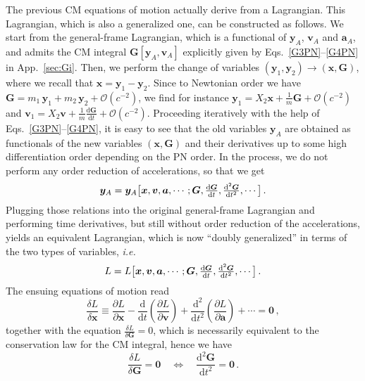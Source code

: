 \documentclass[prd,preprint,superscriptaddress,tightenlines,nofootinbib,
  eqsecnum,showpacs]{revtex4}
\newcommand{\ud}{\mathrm{d}}
\begin{document}
The previous CM equations of motion actually derive from a Lagrangian. This
Lagrangian, which is also a generalized one, can be constructed as follows. We
start from the general-frame Lagrangian, which is a functional of $\bm{y}_A$,
$\bm{v}_A$ and $\bm{a}_A$, and admits the CM integral
$\bm{G}[\bm{y}_A, \bm{v}_A]$ explicitly given by
Eqs.~\eqref{G3PN}--\eqref{G4PN} in App.~\ref{sec:Gi}. Then, we perform the
change of variables $(\bm{y}_1, \bm{y}_2)\longrightarrow (\bm{x}, \bm{G})$,
where we recall that $\bm{x} = \bm{y}_1 - \bm{y}_2$. Since to Newtonian order
we have $\bm{G} = m_1\,\bm{y}_1 + m_2\,\bm{y}_2 + \mathcal{O}(c^{-2})$, we
find for instance
$\bm{y}_1 = X_2\bm{x}+\frac{1}{m}\bm{G} + \mathcal{O}(c^{-2})$ and
$\bm{v}_1 = X_2\bm{v}+\frac{1}{m}\frac{\ud \bm{G}}{\ud t} +
\mathcal{O}(c^{-2})$.
Proceeding iteratively with the help of Eqs.~\eqref{G3PN}--\eqref{G4PN}, it is
easy to see that the old variables $\bm{y}_A$ are obtained as functionals of
the new variables $(\bm{x}, \bm{G})$ and their derivatives up to some high
differentiation order depending on the PN order. In the process, we do not
perform any order reduction of accelerations, so that we get
%
\begin{equation}
\bm{y}_A = \bm{y}_A\bigl[\bm{x}, \bm{v}, \bm{a}, \cdots; \bm{G},
\hbox{$\frac{\ud \bm{G}}{\ud t}$}, \hbox{$\frac{\ud^2 \bm{G}}{\ud t^2}$},
\cdots\bigr]\,.
\end{equation} 
%
Plugging those relations into the original general-frame Lagrangian and
performing time derivatives, but still without order reduction of the
accelerations, yields an equivalent Lagrangian, which is now ``doubly
generalized'' in terms of the two types of variables, \textit{i.e.}
%
\begin{equation}\label{Ldouble}
L = L\bigl[\bm{x}, \bm{v}, \bm{a}, \cdots; \bm{G}, \hbox{$\frac{\ud
    \bm{G}}{\ud t}$}, \hbox{$\frac{\ud^2 \bm{G}}{\ud t^2}$}, \cdots\bigr]\,.
\end{equation} 
%
The ensuing equations of motion read
%
\begin{equation}\label{eomx}
\frac{\delta L}{\delta \bm{x}} \equiv \frac{\partial L}{\partial \bm{x}}
-\frac{\ud}{\ud t}\left(\frac{\partial L}{\partial \bm{v}}\right) +
\frac{\ud^2}{\ud t^2}\left(\frac{\partial L}{\partial \bm{a}}\right) + \cdots
= \bm{0}\,,
\end{equation} 
% 
together with the equation $\frac{\delta L}{\delta \bm{G}} = 0$,
which is necessarily equivalent to the conservation law for the CM integral, hence we have
%
\begin{equation}\label{d2G}
\frac{\delta L}{\delta \bm{G}} = \bm{0} \quad\Longleftrightarrow\quad \frac{\ud^2\bm{G}}{\ud t^2} = \bm{0}\,.
\end{equation} 
\end{document}
